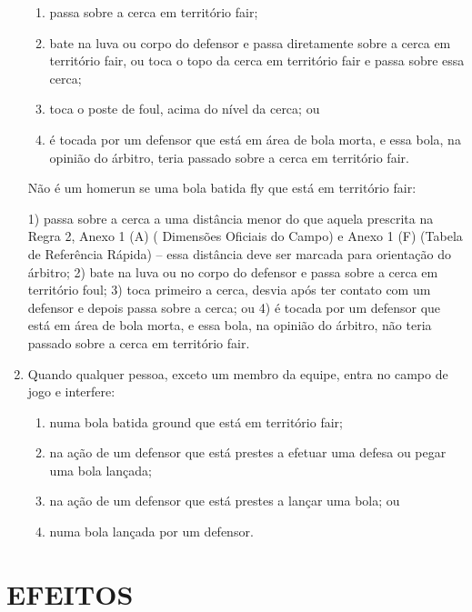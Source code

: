 \begin{enumerate}[label=(\alph*)]
	 \begin{enumerate}[label=\roman*.]
	 	\item passa sobre a cerca em território \gls{fair};
		\item bate na luva ou corpo do defensor e passa diretamente sobre a cerca em território \gls{fair}, ou toca o topo da cerca em território \gls{fair} e passa sobre essa cerca;
		\item  toca o poste de \gls{foul}, acima do nível da cerca; ou
		\item  é tocada por um defensor que está em área de bola morta, e essa bola, na opinião do árbitro, teria passado sobre a cerca em território \gls{fair}.
	\end{enumerate}
	 Não é um \gls{homerun} se uma bola batida \gls{fly} que está em território \gls{fair}:

		 1) passa sobre a cerca a uma distância menor do que aquela prescrita na Regra 2, Anexo 1 (A) ( Dimensões Oficiais do Campo) e Anexo 1 (F) (Tabela de Referência Rápida) -- essa distância deve ser marcada para orientação do árbitro;
		 2) bate na luva ou no corpo do defensor e passa sobre a cerca em território \gls{foul};
		 3) toca primeiro a cerca, desvia após ter contato com um defensor e depois passa sobre a cerca; ou
		 4) é tocada por um defensor que está em área de bola morta, e essa bola, na opinião do árbitro, não teria passado sobre a cerca em território \gls{fair}.

	\item   Quando qualquer pessoa, exceto um membro da equipe, entra no campo de jogo e interfere:

		 \begin{enumerate}[label=\roman*.]
		 	\item  numa bola batida \gls{ground} que está em território \gls{fair};
		\item  na ação de um defensor que está prestes a efetuar uma defesa ou pegar uma bola lançada;
		\item na ação de um defensor que está prestes a lançar uma bola; ou
		\item numa bola lançada por um defensor.
		\end{enumerate}
\end{enumerate}

\section*{EFEITOS}

